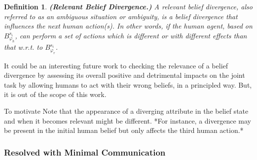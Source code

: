 \documentclass[letterpaper]{article} %
\newtheorem{definition}{Definition}
\begin{document}
\begin{definition} \label{def:reldiv}
\textbf{(Relevant Belief Divergence.)} A relevant belief divergence, also referred to as an ambiguous situation or ambiguity, is a belief divergence that influences the next human action(s). In other words, if the human agent, based on $\mathit{B}_{\varphi_h}^{s_i}$, can perform a set of actions which is different or with different effects than that w.r.t. to $\mathit{B}_{\varphi_r}^{s_i}$.
\end{definition}

It could be an interesting future work to checking the relevance of a belief divergence 
by assessing its overall positive and detrimental impacts on the joint task by allowing humans to act with their wrong beliefs, in a principled way. 
But, it is out of the scope of this work. 

To motivate 
Note that the appearance of a diverging attribute in the belief state and when it becomes relevant 
might be different.
*For instance, a divergence may be present in the initial human belief but only affects the third human action.*

\subsubsection{Resolved with Minimal Communication}



\end{document}
